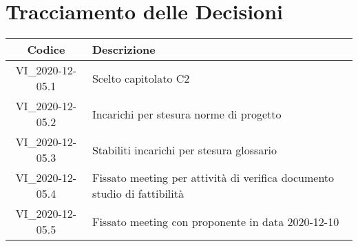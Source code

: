 \section*{Tracciamento delle Decisioni}

\begin{center}
	\begin{longtable}{|c|p{14.5cm}|}
	\hline
	\rowcolor{lighter-grayer}
	\textbf{Codice} & \textbf{Descrizione} \\
	\hline
	\endfirsthead

	\hline
	VI\_2020-12-05.1 & Scelto capitolato C2 \\
	VI\_2020-12-05.2 & Incarichi per stesura norme di progetto \\
	VI\_2020-12-05.3 & Stabiliti incarichi per stesura glossario \\
	VI\_2020-12-05.4 & Fissato meeting per attività di verifica documento studio di fattibilità \\
	VI\_2020-12-05.5 & Fissato meeting con proponente in data 2020-12-10 \\
	\hline

	\end{longtable}
\end{center}